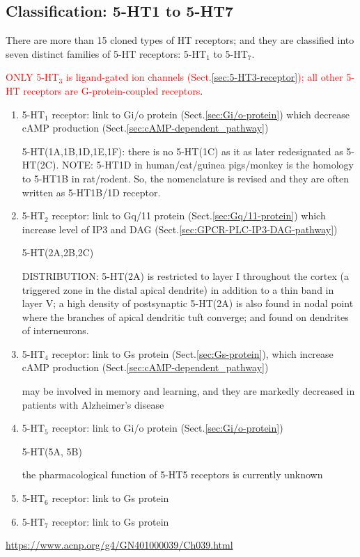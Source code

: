 \subsection{Classification: 5-HT1 to 5-HT7}

There are more than 15 cloned types of HT receptors; and they are classified
into seven distinct families of 5-HT receptors: 5-HT$_1$ to 5-HT$_7$.

\textcolor{red}{ONLY 5-HT$_3$ is ligand-gated ion channels
(Sect.\ref{sec:5-HT3-receptor}); all other 5-HT receptors are G-protein-coupled
receptors}.


\begin{enumerate}

  \item 5-HT$_1$ receptor: link to Gi/o protein (Sect.\ref{sec:Gi/o-protein})
  which decrease cAMP production (Sect.\ref{sec:cAMP-dependent_pathway})
  
  5-HT(1A,1B,1D,1E,1F): there is no 5-HT(1C) as it as later redesignated as
  5-HT(2C). NOTE: 5-HT1D in human/cat/guinea pigs/monkey is the homology to
  5-HT1B in rat/rodent.  So, the nomenclature is revised and they are often
  written as 5-HT1B/1D receptor.
 
  \item 5-HT$_2$ receptor: link to Gq/11 protein (Sect.\ref{sec:Gq/11-protein})
  which increase level of IP3 and DAG (Sect.\ref{sec:GPCR-PLC-IP3-DAG-pathway}) 
  
  5-HT(2A,2B,2C)
  
  DISTRIBUTION: 5-HT(2A) is restricted to layer I throughout the cortex (a
  triggered zone in the distal apical dendrite) in addition to a thin band in
  layer V; a high density of postsynaptic 5-HT(2A) is also found in nodal point
  where the branches of apical dendritic tuft converge; and found on dendrites
  of interneurons.
  
  
  \item 5-HT$_4$ receptor: link to Gs protein (Sect.\ref{sec:Gs-protein}),
  which increase cAMP production (Sect.\ref{sec:cAMP-dependent_pathway}) 
  
  
  may be involved in memory and learning, and they are markedly decreased in
  patients with Alzheimer's disease
  
  \item 5-HT$_5$ receptor: link to Gi/o protein (Sect.\ref{sec:Gi/o-protein})
  
  5-HT(5A, 5B)
  
  the pharmacological function of 5-HT5 receptors is currently unknown
  
  \item 5-HT$_6$ receptor: link to Gs protein
  
  \item 5-HT$_7$  receptor: link to Gs protein 
\end{enumerate}
\url{https://www.acnp.org/g4/GN401000039/Ch039.html}

